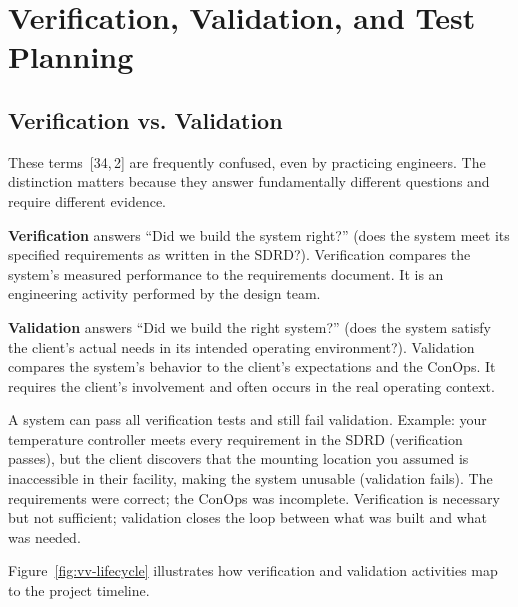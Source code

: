 \chapter{Verification, Validation, and Test Planning}

\section{Verification vs. Validation}
These terms~[34,\,2] are frequently confused, even by practicing engineers. The distinction matters because they answer fundamentally different questions and require different evidence.

\textbf{Verification} answers ``Did we build the system right?'' (does the system meet its specified requirements as written in the SDRD?). Verification compares the system's measured performance to the requirements document. It is an engineering activity performed by the design team.

\textbf{Validation} answers ``Did we build the right system?'' (does the system satisfy the client's actual needs in its intended operating environment?). Validation compares the system's behavior to the client's expectations and the ConOps. It requires the client's involvement and often occurs in the real operating context.

A system can pass all verification tests and still fail validation. Example: your temperature controller meets every requirement in the SDRD (verification passes), but the client discovers that the mounting location you assumed is inaccessible in their facility, making the system unusable (validation fails). The requirements were correct; the ConOps was incomplete. Verification is necessary but not sufficient; validation closes the loop between what was built and what was needed.

Figure~\ref{fig:vv-lifecycle} illustrates how verification and validation activities map to the project timeline.

